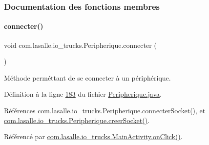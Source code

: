 \subsubsection{Documentation des fonctions membres}
\mbox{\label{classcom_1_1lasalle_1_1io__trucks_1_1_peripherique_ab2c35019f3ba71ec1b3b59470dc383ae}} 
\paragraph{\texorpdfstring{connecter()}{connecter()}}
{\footnotesize\ttfamily void com.\+lasalle.\+io\+\_\+trucks.\+Peripherique.\+connecter (\begin{DoxyParamCaption}{ }\end{DoxyParamCaption})}



Méthode perméttant de se connecter à un périphérique. 



Définition à la ligne \hyperlink{_peripherique_8java_source_l00183}{183} du fichier \hyperlink{_peripherique_8java_source}{Peripherique.\+java}.



Références \hyperlink{_peripherique_8java_source_l00206}{com.\+lasalle.\+io\+\_\+trucks.\+Peripherique.\+connecter\+Socket()}, et \hyperlink{_peripherique_8java_source_l00077}{com.\+lasalle.\+io\+\_\+trucks.\+Peripherique.\+creer\+Socket()}.



Référencé par \hyperlink{_main_activity_8java_source_l00131}{com.\+lasalle.\+io\+\_\+trucks.\+Main\+Activity.\+on\+Click()}.


